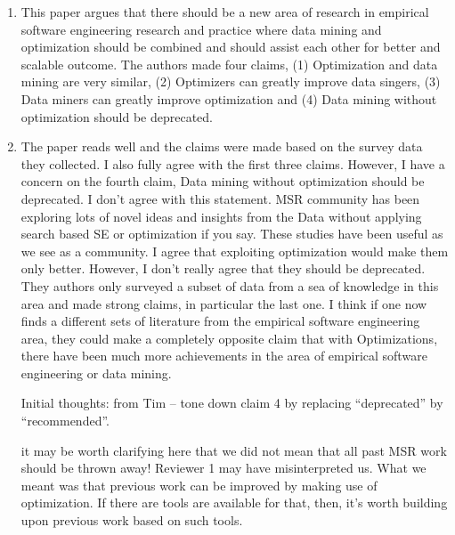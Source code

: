 \documentclass{article}
\newenvironment{com}{\color{blue}\begin{itshape}}{\end{itshape}\vspace{1ex}}
\begin{document}
\begin{enumerate}
\item \begin{com}This paper argues that there should be a new area of research in empirical software engineering research and practice where data mining and optimization should be combined and should assist each other for better and scalable outcome. The authors made four claims, (1) Optimization and data mining are very similar, (2) Optimizers can greatly improve data singers, (3) Data miners can greatly improve optimization and (4) Data mining without optimization should be deprecated.
\end{com}

\item \begin{com}
The paper reads well and the claims were made based on the survey data they collected. I also fully agree with the first three claims. However, I have a concern on the fourth claim, Data mining without optimization should be deprecated. I don't  agree with this statement. MSR community has been exploring lots of novel ideas and insights from the Data without applying search based SE  or optimization if you say. These studies have been useful as we see as a community. I agree that exploiting optimization would make them only better. However, I don't really agree that they should be deprecated. They authors only surveyed a subset of data from a sea of knowledge in this area and made strong claims, in particular the last one. I think if one now finds a different sets of literature from the empirical software engineering area, they could make a completely opposite claim that with Optimizations, there have been much more achievements in the area of empirical software engineering
or data mining. 
\end{com}

Initial thoughts: from Tim -- tone down claim 4 by replacing ``deprecated'' by ``recommended''. 


it may be worth clarifying here that we did not mean that all past MSR work should be thrown away! Reviewer 1 may have misinterpreted us. What we meant was that previous work can be improved by making use of optimization. If there are tools are available for that, then, it's worth building upon previous work based on such tools.


\end{enumerate}
\end{document}
